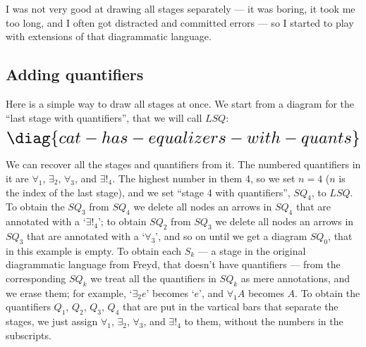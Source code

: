 \documentclass[oneside,12pt]{article}
\begin{document}
I was not very good at drawing all stages separately --- it was
boring, it took me too long, and I often got distracted and committed
errors --- so I started to play with extensions of that diagrammatic
language.



%
\subsection{Adding quantifiers \DONE}
\label{freyd-with-quantifiers}

Here is a simple way to draw all stages at once. We start from a
diagram for the ``last stage with quantifiers'', that we will call
$LSQ$:
%
$$\pu
  \scalebox{1.75}{$
  \diag{cat-has-equalizers-with-quants}
  $}
$$

We can recover all the stages and quantifiers from it. The numbered
quantifiers in it are $∀_1$, $∃_2$, $∀_3$, and $∃!_4$. The highest
number in them 4, so we set $n=4$ ($n$ is the index of the last
stage), and we set ``stage 4 with quantifiers'', $SQ_4$, to $LSQ$. To
obtain the $SQ_3$ from $SQ_4$ we delete all nodes an arrows in $SQ_4$
that are annotated with a `$∃!_4$'; to obtain $SQ_2$ from $SQ_3$ we
delete all nodes an arrows in $SQ_3$ that are annotated with a
`$∀_3$', and so on until we get a diagram $SQ_0$, that in this example
is empty. To obtain each $S_k$ --- a stage in the original
diagrammatic language from Freyd, that doesn't have quantifiers ---
from the corresponding $SQ_k$ we treat all the quantifiers in $SQ_k$
as mere annotations, and we erase them; for example, `$∃_2e$' becomes
`$e$', and $∀_1A$ becomes $A$. To obtain the quantifiers $Q_1$, $Q_2$,
$Q_3$, $Q_4$ that are put in the vartical bars that separate the
stages, we just assign $∀_1$, $∃_2$, $∀_3$, and $∃!_4$ to them,
without the numbers in the subscripts.
\end{document}

